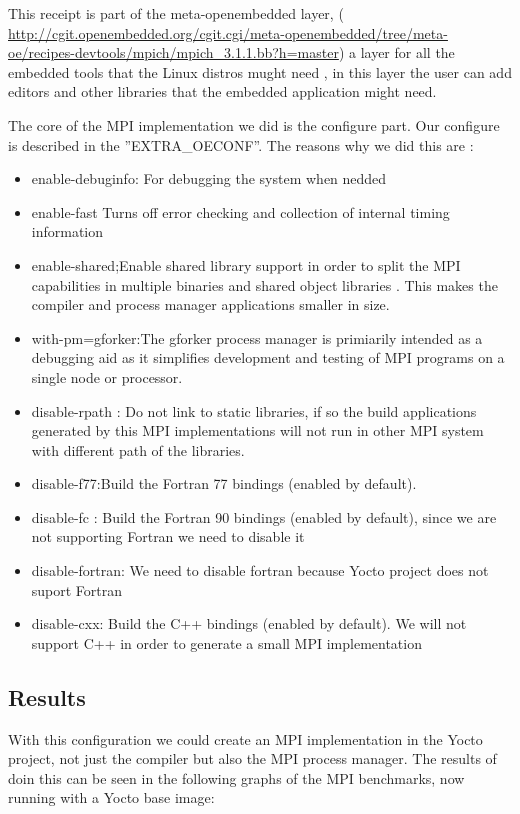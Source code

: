 This receipt is part of the meta-openembedded layer, (
\url{http://cgit.openembedded.org/cgit.cgi/meta-openembedded/tree/meta-oe/recipes-devtools/mpich/mpich_3.1.1.bb?h=master})
a layer for all the embedded tools that the Linux distros mught need , in this
layer the user can add editors and other libraries that the embedded
application might need. 

The core of the MPI implementation we did is the configure part. Our configure
is described in the ''EXTRA\_OECONF''. The reasons why we did this are : 

\begin{itemize}
\item enable-debuginfo: For debugging the system when nedded
\item enable-fast Turns off error checking and collection of internal timing
information
\item enable-shared;Enable shared library support in order to split the MPI
capabilities in multiple binaries and shared object libraries . This makes the
compiler and process manager applications smaller in size.
\item with-pm=gforker:The gforker process manager is primiarily intended as a
debugging aid as it simplifies development and testing of MPI programs on a
single node or processor.
\item disable-rpath : Do not link to static libraries, if so the build
applications generated by this MPI implementations will not run in other MPI
system with different path of the libraries.
\item disable-f77:Build the Fortran 77 bindings (enabled by default).
\item disable-fc : Build the Fortran 90 bindings (enabled by default), since we
are not supporting Fortran we need to disable it 
\item disable-fortran: We need to disable fortran because Yocto project does
not suport Fortran
\item disable-cxx: Build the C++ bindings (enabled by default). We will not
support C++ in order to generate a small MPI implementation
\end{itemize}


\subsection{Results}

With this configuration we could create an MPI implementation in the Yocto
project, not just the compiler but also the MPI process manager. The results of
doin this can be seen in the following graphs of the MPI benchmarks, now
running with a Yocto base image: 

